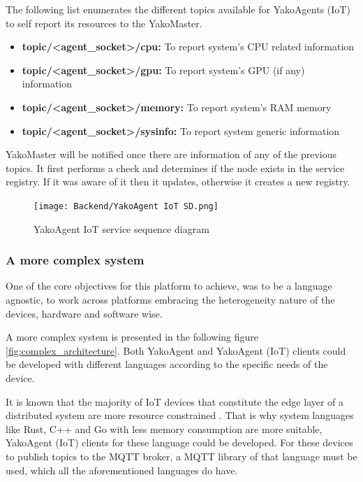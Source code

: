        The following list enumerates the different topics available for YakoAgents (IoT) to self report its resources to the YakoMaster.
        
        \begin{itemize}
            \item \textbf{topic/<agent\_socket>/cpu:} To report system's CPU related information
            \item \textbf{topic/<agent\_socket>/gpu:} To report system's GPU (if any) information
            \item \textbf{topic/<agent\_socket>/memory:} To report system's RAM memory
            \item \textbf{topic/<agent\_socket>/sysinfo:} To report system generic information 
        \end{itemize}
        
        YakoMaster will be notified once there are information of any of the previous topics. It first performs a check and determines if the node exists in the service registry. If it was aware of it then it updates, otherwise it creates a new registry.
        
        \begin{figure}[H]
            \centering
            \texttt{[image: Backend/YakoAgent IoT SD.png]}
            \caption{YakoAgent IoT service sequence diagram}
            \label{fig:yakoagentiot_sd}
        \end{figure}
    
    \subsubsection{A more complex system}
        One of the core objectives for this platform to achieve, was to be a language agnostic, to work across platforms embracing the heterogeneity nature of the devices, hardware and software wise.
        
        A more complex system is presented in the following figure \ref{fig:complex_architecture}. Both YakoAgent and YakoAgent (IoT) clients could be developed with different languages according to the specific needs of the device. 
        
        It is known that the majority of IoT devices that constitute the edge layer of a distributed system are more resource constrained \cite{rajaee_iot_2017}. That is why system languages like Rust, C++ and Go with less memory consumption are more suitable, YakoAgent (IoT) clients for these language could be developed. For these devices to publish topics to the MQTT broker, a MQTT library of that language must be used, which all the aforementioned languages do have. 
        
